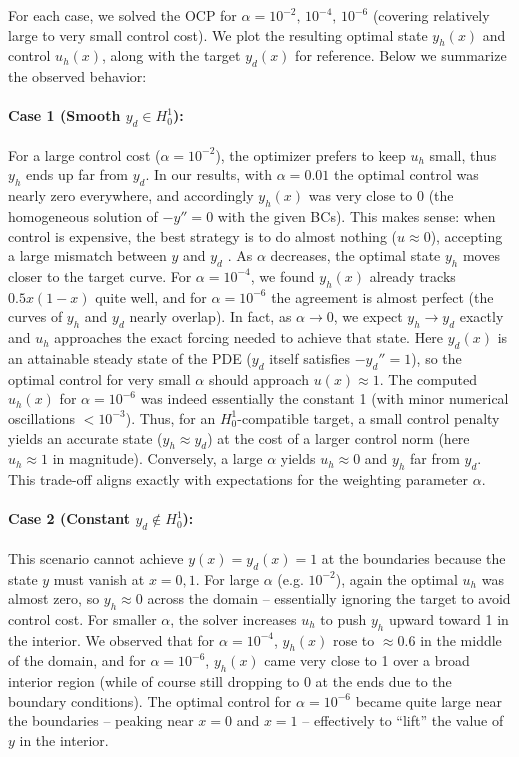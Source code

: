 For each case, we solved the OCP for $\alpha = 10^{-2},\,10^{-4},\,10^{-6}$ (covering relatively large to very small control cost). We plot the resulting optimal state $y_h(x)$ and control $u_h(x)$, along with the target $y_d(x)$ for reference. Below we summarize the observed behavior:

\paragraph{Case 1 (Smooth $y_d \in H^1_0$):} For a large control cost ($\alpha=10^{-2}$), the optimizer prefers to keep $u_h$ small, thus $y_h$ ends up far from $y_d$. In our results, with $\alpha=0.01$ the optimal control was nearly zero everywhere, and accordingly $y_h(x)$ was very close to 0 (the homogeneous solution of $-y''=0$ with the given BCs). This makes sense: when control is expensive, the best strategy is to do almost nothing ($u\approx0$), accepting a large mismatch between $y$ and $y_d$
. As $\alpha$ decreases, the optimal state $y_h$ moves closer to the target curve. For $\alpha=10^{-4}$, we found $y_h(x)$ already tracks $0.5x(1-x)$ quite well, and for $\alpha=10^{-6}$ the agreement is almost perfect (the curves of $y_h$ and $y_d$ nearly overlap). In fact, as $\alpha\to 0$, we expect $y_h\to y_d$ exactly and $u_h$ approaches the exact forcing needed to achieve that state. Here $y_d(x)$ is an attainable steady state of the PDE ($y_d$ itself satisfies $-y_d'' = 1$), so the optimal control for very small $\alpha$ should approach $u(x)\approx 1$. The computed $u_h(x)$ for $\alpha=10^{-6}$ was indeed essentially the constant 1 (with minor numerical oscillations $<10^{-3}$). Thus, for an $H^1_0$-compatible target, a small control penalty yields an accurate state ($y_h \approx y_d$) at the cost of a larger control norm (here $u_h\approx 1$ in magnitude). Conversely, a large $\alpha$ yields $u_h\approx 0$ and $y_h$ far from $y_d$. This trade-off aligns exactly with expectations for the weighting parameter $\alpha$. 

\paragraph{Case 2 (Constant $y_d\notin H^1_0$):} This scenario cannot achieve $y(x)=y_d(x)=1$ at the boundaries because the state $y$ must vanish at $x=0,1$. For large $\alpha$ (e.g. $10^{-2}$), again the optimal $u_h$ was almost zero, so $y_h\approx 0$ across the domain -- essentially ignoring the target to avoid control cost. For smaller $\alpha$, the solver increases $u_h$ to push $y_h$ upward toward 1 in the interior. We observed that for $\alpha=10^{-4}$, $y_h(x)$ rose to $\approx 0.6$ in the middle of the domain, and for $\alpha=10^{-6}$, $y_h(x)$ came very close to 1 over a broad interior region (while of course still dropping to 0 at the ends due to the boundary conditions). The optimal control for $\alpha=10^{-6}$ became quite large near the boundaries -- peaking near $x=0$ and $x=1$ -- effectively to ``lift'' the value of $y$ in the interior. 


